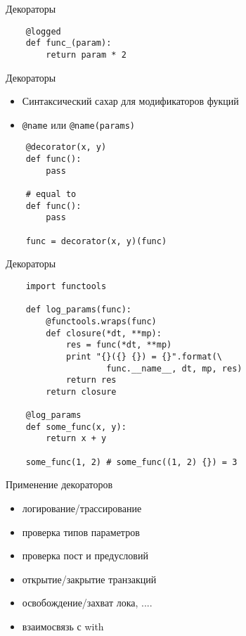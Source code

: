 \documentclass{article}
\begin{document}
\begin{center} Декораторы \end{center}
\begin{lstlisting}
    @logged
    def func_(param):
        return param * 2
\end{lstlisting}
\newpage

\begin{center} Декораторы \end{center}
\begin{itemize}
    \item Синтаксический сахар для модификаторов фукций
    \item \lstinline!@name! или \lstinline!@name(params)!
\end{itemize}
\vspace{15pt}
\begin{lstlisting}
    @decorator(x, y)
    def func():
        pass

    # equal to
    def func():
        pass

    func = decorator(x, y)(func)
\end{lstlisting}
\newpage

\begin{center} Декораторы \end{center}
\vspace{15pt}
\begin{lstlisting}
    import functools

    def log_params(func):
        @functools.wraps(func)
        def closure(*dt, **mp):
            res = func(*dt, **mp)
            print "{}({} {}) = {}".format(\
                    func.__name__, dt, mp, res)
            return res
        return closure

    @log_params
    def some_func(x, y):
        return x + y

    some_func(1, 2) # some_func((1, 2) {}) = 3
\end{lstlisting}
\newpage
\begin{center} Применение декораторов \end{center}
\begin{itemize}
    \item логирование/трассирование
    \item проверка типов параметров
    \item проверка пост и предусловий
    \item открытие/закрытие транзакций
    \item освобождение/захват лока, ....
    \item взаимосвязь с with
\end{itemize}
\newpage
\end{document}
